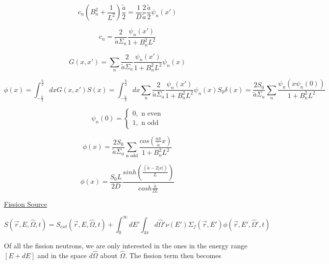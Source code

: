 \documentclass[12pt]{article}
\newcommand{\rvec}{\ensuremath{\vec{r}}}
\newcommand{\omvec}{\ensuremath{\hat{\Omega}}}
\begin{document}
\begin{equation*}
c_n\left(B_n^2 + \frac{1}{L^2}\right)\frac{\tilde{a}}{2} = 
\frac{1}{D}\frac{2}{\tilde{a}}\frac{\tilde{a}}{2}\psi_n(x')
\end{equation*}

\begin{equation*}
c_n = \frac{2}{\tilde{a}\Sigma_a}\frac{\psi_n(x')}{1+B_n^2L^2}
\end{equation*}

\begin{equation*}
G(x,x') = \sum_n \frac{2}{\tilde{a}\Sigma_a}\frac{\psi_n(x')}{1+B_n^2L^2}\psi_n(x)
\end{equation*}

\begin{equation*}
\phi(x) = \int_{-\tfrac{\tilde{a}}{2}}^{\tfrac{\tilde{a}}{2}}dxG(x,x')S(x) = 
\int_{-\tfrac{\tilde{a}}{2}}^{\tfrac{\tilde{a}}{2}}dx 
\sum_n \frac{2}{\tilde{a}\Sigma_a}\frac{\psi_n(x')}{1+B_n^2L^2}\psi_n(x) S_0 \delta(x)
= \frac{2S_0}{\tilde{a}\Sigma_a}\sum_n\frac{\psi_n(x\psi_n(0))}{1+B_n^2L^2}
\end{equation*}

\begin{equation*}
\psi_n(0) = 
	\begin{cases}
	0, \text{ n even} \\
	1, \text{ n odd}
	\end{cases}
\end{equation*}

\begin{equation*}
\phi(x)=\frac{2S_0}{\tilde{a}\Sigma_a}\sum_{\text{n odd}}\frac{cos(\tfrac{n\pi}{\tilde{a}}x)}{1+B_n^2L^2}
\end{equation*}

\begin{equation*}
\phi(x) = \frac{S_0L}{2D}\frac{sinh(\tfrac{(\tilde{a} - 2|x|)}{L})}{cosh\tfrac{\tilde{a}}{2L}}
\end{equation*}

\underline{Fission Source}

\begin{equation*}
S(\rvec,E,\omvec,t) = S_{ext}(\rvec,E,\omvec,t) + 
\int_0^{\infty}dE'\int_{4\pi}d\omvec' \nu(E')\Sigma_f(\rvec,E')\phi(\rvec,E',\omvec',t)
\end{equation*}

Of all the fission neutrons, we are only interested in the ones in the energy range $[E+dE]$ and in the
space $d\omvec$ about $\omvec$. The fission term then becomes
\end{document}
